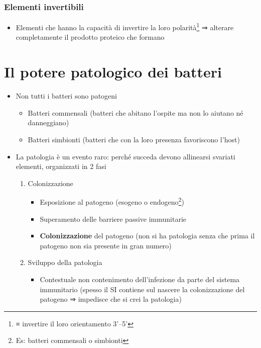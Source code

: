 \documentclass[italian,]{article}
\providecommand{\tightlist}{%
  \setlength{\itemsep}{0pt}\setlength{\parskip}{0pt}}
\begin{document}
\hypertarget{elementi-invertibili}{%
\subsubsection{Elementi invertibili}\label{elementi-invertibili}}

\begin{itemize}
\tightlist
\item
  Elementi che hanno la capacità di invertire la loro polarità\footnote{≡
    invertire il loro orientamento 3'--5'} ⇒ alterare completamente il
  prodotto proteico che formano
\end{itemize}

\hypertarget{il-potere-patologico-dei-batteri}{%
\section{Il potere patologico dei
batteri}\label{il-potere-patologico-dei-batteri}}

\begin{itemize}
\tightlist
\item
  Non tutti i batteri sono patogeni

  \begin{itemize}
  \tightlist
  \item
    Batteri commensali (batteri che abitano l'ospite ma non lo aiutano
    né danneggiano)
  \item
    Batteri simbionti (batteri che con la loro presenza favoriscono
    l'host)
  \end{itemize}
\item
  La patologia è un evento raro: perché succeda devono allinearsi
  svariati elementi, organizzati in 2 fasi

  \begin{enumerate}
  \def\labelenumi{\arabic{enumi}.}
  \tightlist
  \item
    Colonizzazione

    \begin{itemize}
    \tightlist
    \item
      Esposizione al patogeno (esogeno o endogeno\footnote{Es: batteri
        commensali o simbionti})
    \item
      Superamento delle barriere passive immunitarie
    \item
      \textbf{Colonizzazione} del patogeno (non si ha patologia senza
      che prima il patogeno non sia presente in gran numero)
    \end{itemize}
  \item
    Sviluppo della patologia

    \begin{itemize}
    \tightlist
    \item
      Contestuale non contenimento dell'infezione da parte del sistema
      immunitario (spesso il SI contiene sul nascere la colonizzazione
      del patogeno ⇒ impedisce che si crei la patologia)
    \end{itemize}
  \end{enumerate}
\end{itemize}
\end{document}
